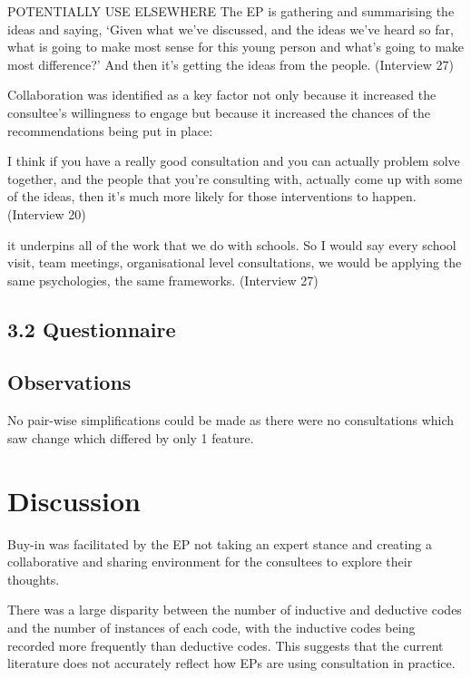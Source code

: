 \documentclass[
  english,
  man]{apa7}
\let\oldparagraph\paragraph
\renewcommand{\paragraph}[1]{\oldparagraph{#1}\mbox{}}
\begin{document}
POTENTIALLY USE ELSEWHERE The EP is gathering and summarising the ideas
and saying, `Given what we've discussed, and the ideas we've heard so
far, what is going to make most sense for this young person and what's
going to make most difference?' And then it's getting the ideas from the
people. (Interview 27)

Collaboration was identified as a key factor not only because it
increased the consultee's willingness to engage but because it increased
the chances of the recommendations being put in place:

I think if you have a really good consultation and you can actually
problem solve together, and the people that you're consulting with,
actually come up with some of the ideas, then it's much more likely for
those interventions to happen. (Interview 20)

it underpins all of the work that we do with schools. So I would say
every school visit, team meetings, organisational level consultations,
we would be applying the same psychologies, the same frameworks.
(Interview 27)

\hypertarget{section}{%
\paragraph{}\label{section}}

\hypertarget{questionnaire-3}{%
\subsection{3.2 Questionnaire}\label{questionnaire-3}}

\hypertarget{observations}{%
\subsection{Observations}\label{observations}}

No pair-wise simplifications could be made as there were no
consultations which saw change which differed by only 1 feature.

\hypertarget{discussion}{%
\section{Discussion}\label{discussion}}

Buy-in was facilitated by the EP not taking an expert stance and
creating a collaborative and sharing environment for the consultees to
explore their thoughts.

There was a large disparity between the number of inductive and deductive codes and the number of instances of each code, with the inductive codes being recorded more frequently than deductive codes. This suggests that the current literature does not accurately reflect how EPs are using consultation in practice.
\end{document}
